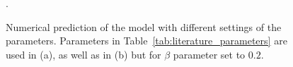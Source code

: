 \begin{figure}[!ht]\centering
{}
\caption{Numerical prediction of the model with different settings of the parameters. Parameters in Table~\ref{tab:literature_parameters} are used in (a), as well as in (b) but for $\beta$ parameter set to $0.2$.}.
\end{figure}



